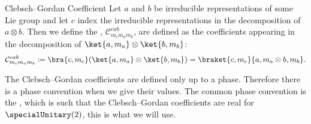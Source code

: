 \documentclass[fleqn]{NotesClass}
\newcommand*{\directproduct}{\otimes}
\newcommand*{\clebschgordan}[6]{\mathcal{C}_{#1#2#3}^{#4#5#6}}
\begin{document}
    \begin{dfn}{Clebsch--Gordan Coefficient}{}
        Let \(a\) and \(b\) be irreducible representations of some Lie group and let \(c\) index the irreducible representations in the decomposition of \(a \directproduct b\).
        Then we define the , \(\clebschgordan{m_c}{m_a}{m_b}{c}{a}{b}\), are defined as the coefficients appearing in the decomposition of \(\ket{a, m_a} \directproduct \ket{b, m_b}\):
        \begin{equation}
            \clebschgordan{m_c}{m_a}{m_b}{c}{a}{b} \coloneqq \bra{c, m_c} (\ket{a, m_a} \directproduct \ket{b, m_b}) = \braket{c, m_c}{a, m_a \directproduct b, m_b}.
        \end{equation}
    \end{dfn}
    \begin{wrn}
        The Clebsch--Gordan coefficients are defined only up to a phase.
        Therefore there is a phase convention when we give their values.
        The common phase convention is the , which is such that the Clebsch--Gordan coefficients are real for \(\specialUnitary(2)\), this is what we will use.
    \end{wrn}
    
\end{document}
